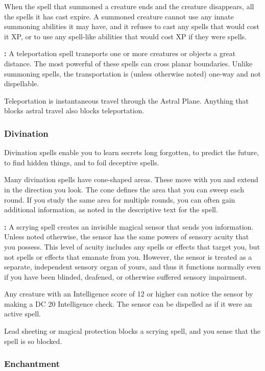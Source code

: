 When the spell that summoned a creature ends and the creature disappears, all the 
spells it has cast expire. A summoned creature cannot use any innate summoning 
abilities it may have, and it refuses to cast any spells that would cost it XP, 
or to use any spell-like abilities that would cost XP if they were spells.

\textbf{:} A teleportation spell transports one or more creatures 
or objects a great distance. The most powerful of these spells can cross planar 
boundaries. Unlike summoning spells, the transportation is (unless otherwise noted) 
one-way and not dispellable.

Teleportation is instantaneous travel through the Astral Plane. Anything that blocks 
astral travel also blocks teleportation.

\subsubsection{Divination}

Divination spells enable you to learn secrets long forgotten, to predict the future, 
to find hidden things, and to foil deceptive spells.

Many divination spells have cone-shaped areas. These move with you and extend in 
the direction you look. The cone defines the area that you can sweep each round. 
If you study the same area for multiple rounds, you can often gain additional information, 
as noted in the descriptive text for the spell.

\textbf{:} A scrying spell creates an invisible magical sensor that sends 
you information. Unless noted otherwise, the sensor has the same powers of sensory 
acuity that you possess. This level of acuity includes any spells or effects that 
target you, but not spells or effects that emanate from you. However, the sensor 
is treated as a separate, independent sensory organ of yours, and thus it functions 
normally even if you have been blinded, deafened, or otherwise suffered sensory 
impairment.

Any creature with an Intelligence score of 12 or higher can notice the sensor by 
making a DC 20 Intelligence check. The sensor can be dispelled as if it were an 
active spell.

Lead sheeting or magical protection blocks a scrying spell, and you sense that 
the spell is so blocked.

\subsubsection{Enchantment}

